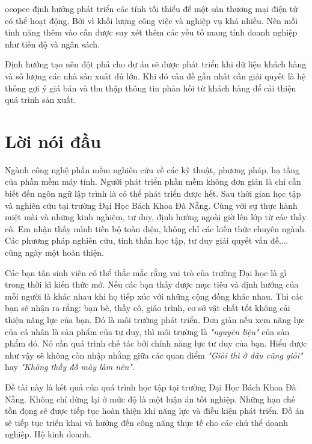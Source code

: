 \documentclass[11pt]{report}
\begin{document}
\gls{ocopee} định hướng phát triển các tính tối thiểu để một sàn thương mại điện tử có thể hoạt động. Bởi vì khối lượng công việc và nghiệp vụ khá nhiều. Nên mỗi tính năng thêm vào cần được suy xét thêm các yếu tố mang tính doanh nghiệp như tiến độ và ngân sách.

Định hướng tạo nên đột phá cho dự án sẽ được phát triển khi dữ liệu khách hàng và số lượng các nhà sản xuất đủ lớn. Khi đó vấn đề gần nhất cần giải quyết là hệ thống gợi ý giá bán và thu thập thông tin phản hồi từ khách hàng để cải thiện quá trình sản xuất.

\pagebreak




\setcounter{page}{1}

\chapter*{Lời nói đầu}
\justifying
Ngành công nghệ phần mềm nghiên cứu về các kỹ thuật, phương pháp, hạ tầng của phần mềm máy tính. Người phát triển phần mềm không đơn giản là chỉ cần biết đến ngôn ngữ lập trình là có thể phát triển được hết. Sau thời gian học tập và nghiên cứu tại trường Đại Học Bách Khoa Đà Nẵng. Cùng với sự thực hành miệt mài và những kinh nghiệm, tư duy, định hướng ngoài giờ lên lớp từ các thầy cô. Em nhận thấy mình tiến bộ toàn diện, không chỉ các kiến thức chuyên ngành. Các phương pháp nghiên cứu, tinh thần học tập, tư duy giải quyết vấn đề,... cũng ngày một hoàn thiện.

Các bạn tân sinh viên có thể thắc mắc rằng vai trò của trường Đại học là gì trong thời kì kiến thức mở. Nếu các bạn thấy được mục tiêu và định hướng của mỗi người là khác nhau khi họ tiếp xúc với những cộng đồng khác nhau. Thì các bạn sẽ nhận ra rằng: bạn bè, thầy cô, giáo trình, cơ sở vật chất tốt không cải thiện năng lực của bạn. Đó là môi trường phát triển. Đơn giản nếu xem năng lực của cá nhân là sản phẩm của tư duy, thì môi trường là \emph{"nguyên liệu"} của sản phẩm đó. Nó cần quá trình chế tác bởi chính năng lực tư duy của bạn. Hiểu được như vậy sẽ không còn nhập nhằng giữa các quan điểm \emph{"Giỏi thì ở đâu cũng giỏi"} hay \emph{"Không thầy đố mày làm nên"}.

Đề tài này là kết quả của quá trình học tập tại trường Đại Học Bách Khoa Đà Nẵng. Không chỉ dừng lại ở mức độ là một luận án tốt nghiệp. Những hạn chế tồn đọng sẽ được tiếp tục hoàn thiện khi năng lực và điều kiện phát triển. Đồ án sẽ tiếp tục triển khai và hướng đến công năng thực tế cho các chủ thể doanh nghiệp. Hộ kinh doanh.
\end{document}
